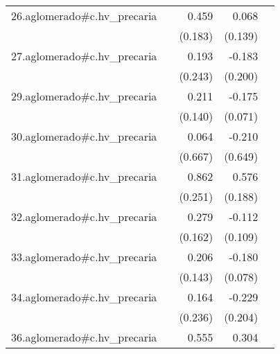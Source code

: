 {\begin{longtable}{l*{4}{D{.}{.}{-1}}}
\addlinespace
26.aglomerado#c.hv\_precaria&                     &       0.459\sym{*}  &       0.068         &                     \\
            &                     &     (0.183)         &     (0.139)         &                     \\
\addlinespace
27.aglomerado#c.hv\_precaria&                     &       0.193         &      -0.183         &                     \\
            &                     &     (0.243)         &     (0.200)         &                     \\
\addlinespace
29.aglomerado#c.hv\_precaria&                     &       0.211         &      -0.175\sym{*}  &                     \\
            &                     &     (0.140)         &     (0.071)         &                     \\
\addlinespace
30.aglomerado#c.hv\_precaria&                     &       0.064         &      -0.210         &                     \\
            &                     &     (0.667)         &     (0.649)         &                     \\
\addlinespace
31.aglomerado#c.hv\_precaria&                     &       0.862\sym{***}&       0.576\sym{**} &                     \\
            &                     &     (0.251)         &     (0.188)         &                     \\
\addlinespace
32.aglomerado#c.hv\_precaria&                     &       0.279         &      -0.112         &                     \\
            &                     &     (0.162)         &     (0.109)         &                     \\
\addlinespace
33.aglomerado#c.hv\_precaria&                     &       0.206         &      -0.180\sym{*}  &                     \\
            &                     &     (0.143)         &     (0.078)         &                     \\
\addlinespace
34.aglomerado#c.hv\_precaria&                     &       0.164         &      -0.229         &                     \\
            &                     &     (0.236)         &     (0.204)         &                     \\
\addlinespace
36.aglomerado#c.hv\_precaria&                     &       0.555\sym{*}  &       0.304         &                     \\

\end{longtable}}
